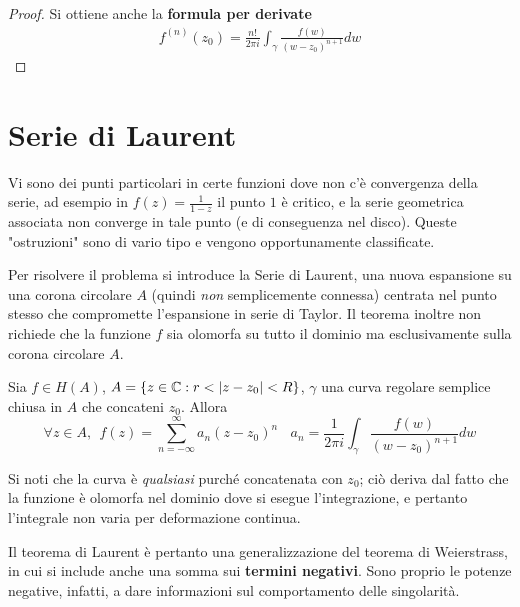 \begin{proof}
Si ottiene anche la \textbf{formula per derivate}
\begin{gather*}
f^{(n)}(z_{0}) = \frac{n!}{2\pi i}\int_{\gamma}\frac{f(w)}{(w - z_{0})^{n + 1}} dw
\end{gather*}
\end{proof}

\section{Serie di Laurent}

Vi sono dei punti particolari in certe funzioni dove non c'è convergenza della serie, ad esempio in $f(z) = \frac{1}{1 - z}$ il punto $1$ è critico, e la serie geometrica associata non converge in tale punto (e di conseguenza nel disco). Queste "ostruzioni" sono di vario tipo e vengono opportunamente classificate.

Per risolvere il problema si introduce la Serie di Laurent, una nuova espansione su una corona circolare $A$ (quindi \textit{non} semplicemente connessa) centrata nel punto stesso che compromette l'espansione in serie di Taylor. Il teorema inoltre non richiede che la funzione $f$ sia olomorfa su tutto il dominio ma esclusivamente sulla corona circolare $A$.
\begin{thm}
Sia $f\in H(A)$, $A = \{z\in \mathbb{C} : r < | z - z_{0}| < R\}$, $\gamma $ una curva regolare semplice chiusa in $A$ che concateni $z_{0}$. Allora
\begin{equation*}
\boxed{\forall z\in A, \ \ f(z) = \sum\limits^{\infty}_{n = - \infty} a_{n}(z - z_{0})^{n} \ \ \ \ a_{n} = \frac{1}{2\pi i}\int_{\gamma}\frac{f(w)}{(w - z_{0})^{n + 1}} dw}
\end{equation*}
\end{thm}
Si noti che la curva è \textit{qualsiasi} purché concatenata con $z_{0}$; ciò deriva dal fatto che la funzione è olomorfa nel dominio dove si esegue l'integrazione, e pertanto l'integrale non varia per deformazione continua.

Il teorema di Laurent è pertanto una generalizzazione del teorema di Weierstrass, in cui si include anche una somma sui \textbf{termini negativi}. Sono proprio le potenze negative, infatti, a dare informazioni sul comportamento delle singolarità.

